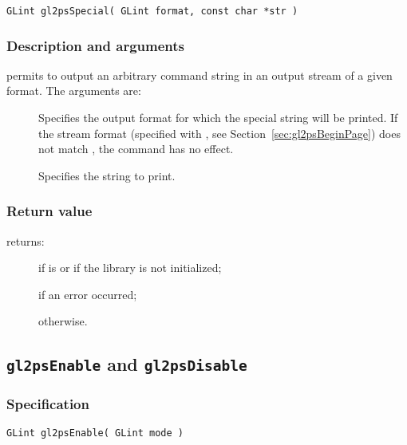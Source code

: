 \begin{verbatim}
GLint gl2psSpecial( GLint format, const char *str )
\end{verbatim}

\subsubsection{Description and arguments}

 permits to output an arbitrary command string in an
output stream of a given format. The arguments are:

\begin{description}
\item[] Specifies the output format for which the special
  string will be printed. If the stream format (specified with
  , see Section~\ref{sec:gl2psBeginPage}) does not
  match , the command has no effect.
\item[] Specifies the string to print.
\end{description}

\subsubsection{Return value}

\noindent{} returns:
\begin{description}
\item[] if  is  or if the
  library is not initialized;
\item[] if an error occurred;
\item[] otherwise.
\end{description}


\subsection{\texttt{gl2psEnable} and \texttt{gl2psDisable}}
\label{sec:gl2psEnable}

\subsubsection{Specification}

\begin{verbatim}
GLint gl2psEnable( GLint mode )
\end{verbatim}


